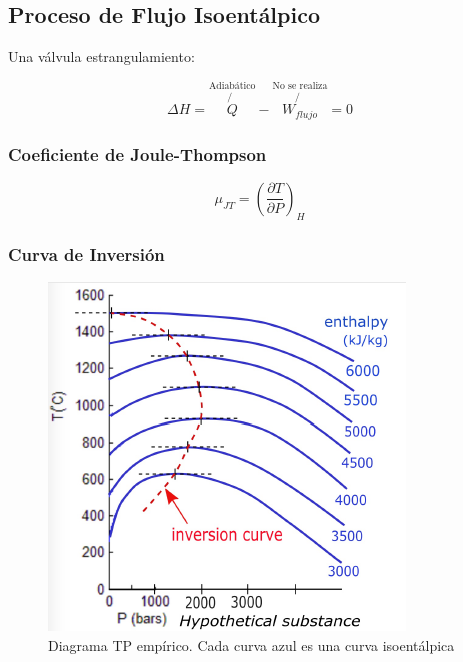     \subsection{Proceso de Flujo Isoentálpico}
    
    Una válvula estrangulamiento:
    
    \[\Delta H = \overset{\text{Adiabático}}{\not{Q}} - \overset{\text{No se realiza}}{\not{W_{flujo}}} = 0\]
    
        \subsubsection{Coeficiente de Joule-Thompson}
        
        \begin{quote}
            \textit{}
        \end{quote}
        
        \begin{equation}
        \label{coef_joule_thompson}
            \mu_{JT} = \left ( \frac{\partial T}{\partial P}\right )_{H}
        \end{equation}
    
        \subsubsection{Curva de Inversión}
        
        \begin{figure}[H]
            \centering
            \includegraphics[width=.5\textwidth]{img/clases/curva_inversion.png}
            \caption{Diagrama TP empírico. Cada curva azul es una curva isoentálpica}
            \label{fig:diagrama_t_p}
        \end{figure}
        

